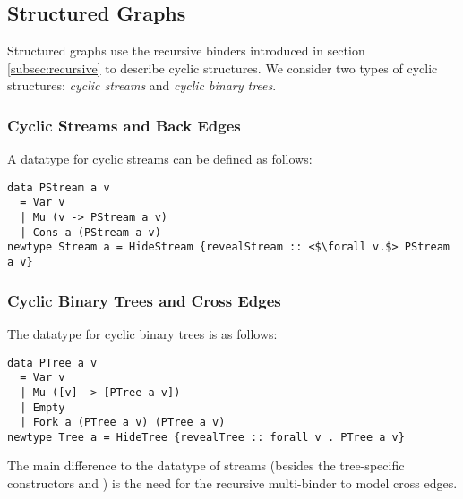\subsection{Structured Graphs}\label{subsec:graphs}

Structured graphs use the recursive binders introduced in section \ref{subsec:recursive} to describe cyclic structures. We consider two types of cyclic structures: \emph{cyclic streams} and \emph{cyclic binary trees}.

\subsubsection{Cyclic Streams and Back Edges}
\label{subsubsec:streams}

A datatype for cyclic streams can be defined as follows:

\vspace{1mm}
\begin{verbatim}
data PStream a v
  = Var v
  | Mu (v -> PStream a v)
  | Cons a (PStream a v)
newtype Stream a = HideStream {revealStream :: <$\forall v.$> PStream a v}
\end{verbatim}
\vspace{1mm}

\subsubsection{Cyclic Binary Trees and Cross Edges}
\label{subsubsec:trees}

The datatype for cyclic binary trees is as follows:

\vspace{1mm}
\begin{verbatim}
data PTree a v
  = Var v
  | Mu ([v] -> [PTree a v])
  | Empty
  | Fork a (PTree a v) (PTree a v)
newtype Tree a = HideTree {revealTree :: forall v . PTree a v}
\end{verbatim}
\vspace{1mm}

The main difference to the datatype of streams (besides the tree-specific constructors  and ) is the need for the recursive multi-binder to model cross edges.
